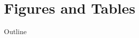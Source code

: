 \documentclass{beamer}
\begin{document}
\section{Figures and Tables}

\begin{frame}{Outline}
\begin{multicols}{2}
\tableofcontents[currentsection]
\end{multicols}
\end{frame}

\end{document}
